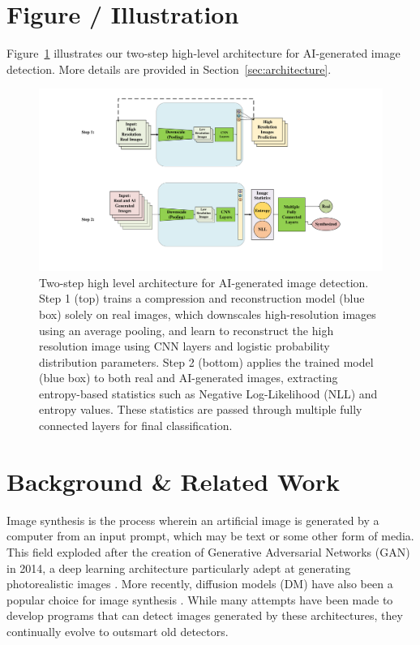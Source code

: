 \documentclass{article} %
\begin{document}
\section{Figure / Illustration}
\label{illustration}
Figure~\ref{fig:high-level-architecture} illustrates our two-step high-level architecture for AI-generated image detection. More details are provided in Section~\ref{sec:architecture}.

\begin{figure}[htbp]
    \centering
    \includegraphics[width=\linewidth]{Fig/high_level_architecture.pdf}
    \caption{Two-step high level architecture for AI-generated image detection. Step 1 (top) trains a compression and reconstruction model (blue box) solely on real images, which downscales high-resolution images using an average pooling, and learn to reconstruct the high resolution image using CNN layers and logistic probability distribution parameters. Step 2 (bottom) applies the trained model (blue box) to both real and AI-generated images, extracting entropy-based statistics such as Negative Log-Likelihood (NLL) and entropy values. These statistics are passed through multiple fully connected layers for final classification.}
    \label{fig:high-level-architecture}
\end{figure}

\section{Background \& Related Work}
\label{background}

Image synthesis is the process wherein an artificial image is generated by a computer from an input prompt, which may be text or some other form of media. This field exploded after the creation of Generative Adversarial Networks (GAN) in 2014, a deep learning architecture particularly adept at generating photorealistic images \citep{GANfather}. More recently, diffusion models (DM) have also been a popular choice for image synthesis \citep{latent-diffusion}. While many attempts have been made to develop programs that can detect images generated by these architectures, they continually evolve to outsmart old detectors.
\end{document}
